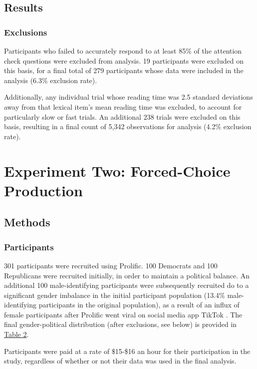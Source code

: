 \documentclass[10pt,letterpaper]{article}
\begin{document}
	\subsection{Results}
	\subsubsection{Exclusions}
	Participants who failed to accurately respond to at least 85\% of the attention check questions were excluded from analysis. 19 participants were excluded on this basis, for a final total of 279 participants whose data were included in the analysis (6.3\% exclusion rate). \par 
	Additionally, any individual trial whose reading time was 2.5 standard deviations away from that lexical item's mean reading time was excluded, to account for particularly slow or fast trials. An additional 238 trials were excluded on this basis, resulting in a final count of 5,342 observations for analysis (4.2\% exclusion rate). 
	
	\section{Experiment Two: Forced-Choice Production}
	\subsection{Methods}
	\subsubsection{Participants} 301 participants were recruited using Prolific. 100 Democrats and 100 Republicans were recruited initially, in order to maintain a political balance. An additional 100 male-identifying participants were subsequently recruited do to a significant gender imbalance in the initial participant population (13.4\% male-identifying participants in the original population), as a result of an influx of female participants after Prolific went viral on social media app TikTok \parencite{charalambides2021}. The final gender-political distribution (after exclusions, see below) is provided in \hyperref[exp2-sample-table]{Table 2}.\par
	Participants were paid at a rate of \$15-\$16 an hour for their participation in the study, regardless of whether or not their data was used in the final analysis.
	
\end{document}
